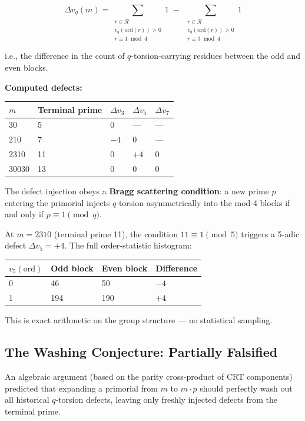 \documentclass[11pt,letterpaper]{article}
\theoremstyle{definition}
\theoremstyle{remark}
\begin{document}
\[\Delta v_q(m) = \sum_{\substack{r \in \mathcal{R} \\ v_q(\text{ord}(r)) > 0 \\ r \equiv 1 \bmod 4}} 1 \;-\; \sum_{\substack{r \in \mathcal{R} \\ v_q(\text{ord}(r)) > 0 \\ r \equiv 3 \bmod 4}} 1\]

i.e., the difference in the count of $q$-torsion-carrying residues between the odd and even blocks.

\textbf{Computed defects:}

\begin{longtable}[]{@{}lllll@{}}
\toprule
$m$ & Terminal prime & $\Delta v_3$ & $\Delta v_5$ & $\Delta v_7$ \\
\midrule
\endhead
\bottomrule
30 & 5 & 0 & --- & --- \\
210 & 7 & $-4$ & 0 & --- \\
2310 & 11 & 0 & $+4$ & 0 \\
30030 & 13 & 0 & 0 & 0 \\
\end{longtable}

The defect injection obeys a \textbf{Bragg scattering condition}: a new prime $p$ entering the primorial injects $q$-torsion asymmetrically into the mod-4 blocks if and only if $p \equiv 1 \pmod{q}$.

At $m = 2310$ (terminal prime 11), the condition $11 \equiv 1 \pmod{5}$ triggers a 5-adic defect $\Delta v_5 = +4$. The full order-statistic histogram:

\begin{longtable}[]{@{}llll@{}}
\toprule
$v_5(\text{ord})$ & Odd block & Even block & Difference \\
\midrule
\endhead
\bottomrule
0 & 46 & 50 & $-4$ \\
1 & 194 & 190 & $+4$ \\
\end{longtable}

This is exact arithmetic on the group structure --- no statistical sampling.

\subsection{The Washing Conjecture: Partially Falsified}\label{the-washing-conjecture-partially-falsified}

An algebraic argument (based on the parity cross-product of CRT components) predicted that expanding a primorial from $m$ to $m \cdot p$ should perfectly wash out all historical $q$-torsion defects, leaving only freshly injected defects from the terminal prime.
\end{document}

